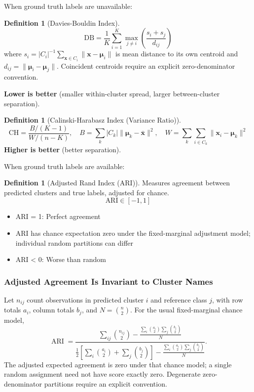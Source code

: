 \documentclass[11pt,twoside]{article}
\numberwithin{equation}{section}
\newcommand{\vect}[1]{\bm{#1}}
\theoremstyle{plain}
\theoremstyle{definition}
\newtheorem{definition}[theorem]{Definition}
\theoremstyle{remark}
\begin{document}
When ground truth labels are unavailable:

\begin{definition}[Davies-Bouldin Index]
\[
\text{DB} = \frac{1}{K}\sum_{i=1}^K \max_{j \neq i} \left(\frac{s_i + s_j}{d_{ij}}\right)
\]
where $s_i=|C_i|^{-1}\sum_{\vect x\in C_i}\|\vect x-\vect\mu_i\|$ is mean distance to its own centroid and $d_{ij}=\|\vect\mu_i-\vect\mu_j\|$. Coincident centroids require an explicit zero-denominator convention.

\textbf{Lower is better} (smaller within-cluster spread, larger between-cluster separation).
\end{definition}

\begin{definition}[Calinski-Harabasz Index (Variance Ratio)]
\[
\text{CH} = \frac{B/(K-1)}{W/(n-K)},\quad B=\sum_k|C_k|\|\vect\mu_k-\bar{\vect x}\|^2,\quad W=\sum_k\sum_{i\in C_k}\|\vect x_i-\vect\mu_k\|^2
\]
\textbf{Higher is better} (better separation).
\end{definition}

When ground truth labels are available:

\begin{definition}[Adjusted Rand Index (ARI)]
Measures agreement between predicted clusters and true labels, adjusted for chance.
\[
\text{ARI} \in [-1, 1]
\]
\begin{itemize}
\item ARI = 1: Perfect agreement
\item ARI has chance expectation zero under the fixed-marginal adjustment model; individual random partitions can differ
\item ARI < 0: Worse than random
\end{itemize}
\end{definition}

\subsubsection{Adjusted Agreement Is Invariant to Cluster Names}
Let $n_{ij}$ count observations in predicted cluster $i$ and reference class $j$, with row totals $a_i$, column totals $b_j$, and $N=\binom n2$. For the usual fixed-marginal chance model,
\[
\operatorname{ARI}=\frac{\sum_{ij}\binom{n_{ij}}2-\frac{\sum_i\binom{a_i}2\sum_j\binom{b_j}2}{N}}
{\frac12\left[\sum_i\binom{a_i}2+\sum_j\binom{b_j}2\right]-\frac{\sum_i\binom{a_i}2\sum_j\binom{b_j}2}{N}}.
\]
The adjusted expected agreement is zero under that chance model; a single random assignment need not have score exactly zero. Degenerate zero-denominator partitions require an explicit convention.
\end{document}
